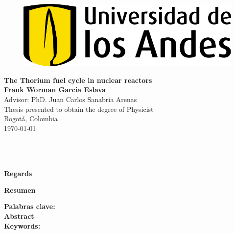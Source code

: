 
\begin{center}
\begin{figure}
    \centering%
    \includegraphics[scale=0.45]{HojaTitulo/Figures_HojaTitulo/Universidad_de_los_Andes_(logo).png} %
\end{figure}
\thispagestyle{empty} \vspace*{2.0cm} \textbf{\LARGE
The Thorium fuel cycle in nuclear reactors}\\[2.5cm]

\Large\textbf{Frank Worman Garcia Eslava}\\[2.0cm]

Advisor: PhD. Juan Carlos Sanabria Arenas \\[2.0cm]


\Large Thesis presented to obtain the degree of Physicist \\ [2.0cm]


Bogot\'{a}, Colombia\\ [0.5cm]
\today \\
\end{center}

\newpage{\pagestyle{empty}\cleardoublepage}

\newpage
\thispagestyle{empty} \textbf{}\normalsize
\\\\\\%
\textbf{\LARGE Regards}\\



\newpage{\pagestyle{empty}\cleardoublepage}

\textbf{\LARGE Resumen}


\textbf{\small Palabras clave: }\\


\newpage
\textbf{\LARGE Abstract}\\


\textbf{\small Keywords:}\\